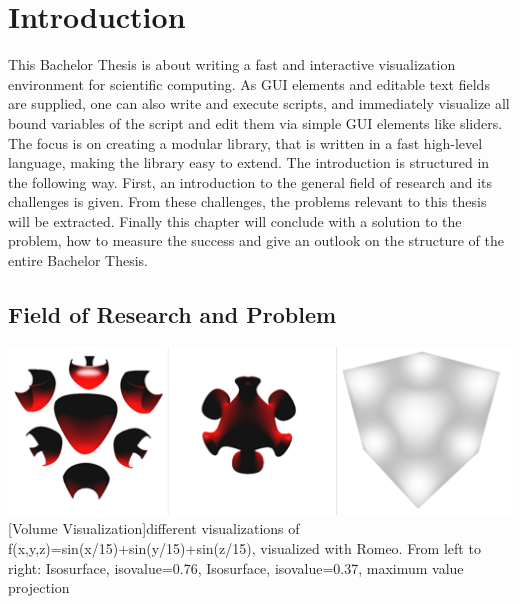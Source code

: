 \section{Introduction}
This Bachelor Thesis is about writing a fast and interactive visualization environment for scientific computing. 
As GUI elements and editable text fields are supplied, one can also write and execute scripts, and immediately visualize all bound variables of the script and edit them via simple GUI elements like sliders. The focus is on creating a modular library, that is written in a fast high-level language, making the library easy to extend.
The introduction is structured in the following way.
First, an introduction to the general field of research and its challenges is given. 
From these challenges, the problems relevant to this thesis will be extracted.
Finally this chapter will conclude with a solution to the problem, how to measure the success and give an outlook on the structure of the entire Bachelor Thesis.
 
\subsection{Field of Research and Problem}

\vspace{1em}
\begin{minipage}{\linewidth}
    \centering
    \includegraphics[width=0.7\linewidth]{Bilder/surfaces.png}
    [Volume Visualization]{different visualizations of f(x,y,z)=sin(x/15)+sin(y/15)+sin(z/15), visualized with Romeo. From left to right: Isosurface, isovalue=0.76, Isosurface, isovalue=0.37, maximum value projection}
    \label{fig:volume}
\end{minipage}

